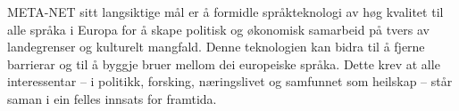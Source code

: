 \begin{multicols}{2}


META-NET sitt langsiktige mål er å formidle språkteknologi av høg kvalitet til alle språka i Europa for å skape politisk og økonomisk samarbeid på tvers av landegrenser og kulturelt mangfald. Denne teknologien kan bidra til å fjerne barrierar og til å byggje bruer mellom dei europeiske språka. Dette krev at alle interessentar – i politikk, forsking, næringslivet og samfunnet som heilskap – står saman i ein felles innsats for framtida.

\end{multicols}

\clearpage


